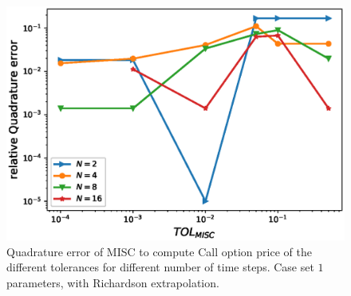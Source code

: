 \documentclass[11pt]{article}
\begin{document}
\begin{figure}[h!]
	\centering
	\includegraphics[width=0.7\linewidth]{./figures/rBergomi_MISC_quadratre_error/vs_TOL/set1/relative_quad_error_wrt_MISC_TOL_set1_with_rich}
	
	
	\caption{Quadrature error of MISC to compute Call option price of the different tolerances for different number of time steps. Case  set $1$ parameters, with Richardson extrapolation.}
	\label{fig:Quadrature_error_set1_rich}
\end{figure}
\end{document}
